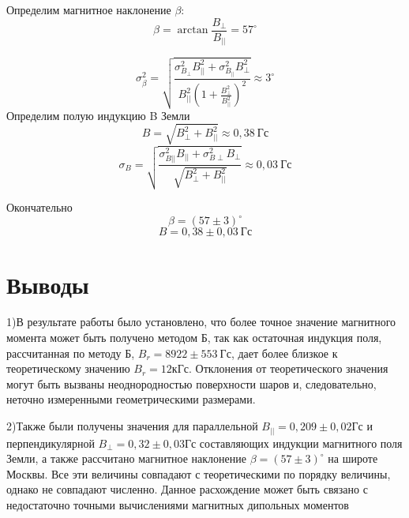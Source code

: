 \documentclass[a4paper,12pt]{article}
\begin{document}
Определим магнитное наклонение $\beta$:
$$
	\beta = \arctan \frac{B_{\perp}}{B_{||}} = 57 ^\circ
$$

$$
	\sigma_{\beta}^2 = \sqrt{\frac{\sigma_{B_{\perp}}^2 B_{||}^2 +\sigma_{B_{||}}^2 B_{\perp}^2} {B_{||}^2 (1 + \frac{B_{\perp}^2}{B_{||}^2})^2}} \approx 3^\circ
$$
Определим полую индукцию B Земли
$$
	B = \sqrt{B_{\perp}^2 + B_{||}^2} \approx 0,38 \ Гс	
$$
$$
	\sigma_B = \sqrt{\frac{\sigma_{B{||}}^2B_{||} + \sigma_{B{\perp}}^2B_{\perp}}{\sqrt{B_{\perp}^2 + B_{||}^2}}} \approx 0,03 \ Гс
$$

Окончательно
$$
	\beta = (57 \pm 3)^\circ
$$
$$
	B = 0,38 \pm 0,03 \ Гс
$$



\section{Выводы}


1)В результате работы было установлено, что более точное значение магнитного момента может быть получено методом Б, так как остаточная индукция поля, рассчитанная по методу Б, $B_r = 8922 \pm 553 \ Гс $, дает более близкое к теоретическому значению $B_r = 12 кГс$. Отклонения от теоретического значения могут быть вызваны неоднородностью поверхности шаров и, следовательно, неточно измеренными геометрическими размерами.

2)Также были получены значения для параллельной $B_{||} = 0,209 \pm 0,02 Гс$ и перпендикулярной $B_{\perp} = 0,32 \pm 0,03 Гс$ составляющих индукции магнитного поля Земли, а также рассчитано магнитное наклонение $\beta = (57 \pm 3)^\circ$ на широте Москвы. Все эти величины совпадают с теоретическими по порядку величины, однако не совпадают численно. Данное расхождение может быть связано с недостаточно точными вычислениями магнитных дипольных моментов 
\end{document}
